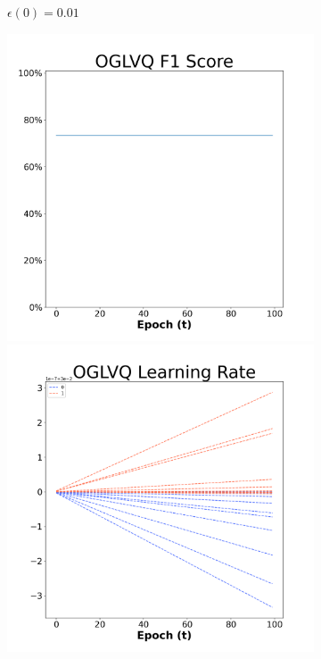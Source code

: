 \begin{figure}[H]
\begin{subfigure}{0.3\textwidth}
\caption{$\epsilon(0)=0.01$}
\end{subfigure}\hfil %
\begin{subfigure}{0.3\textwidth}
\includegraphics[width=\linewidth]{images/exper2/SP/OGLVQ_0.03_f1.png}
\includegraphics[width=\linewidth]{images/exper2/SP/OGLVQ_0.03_lr.png}

\end{subfigure}
\end{figure}
